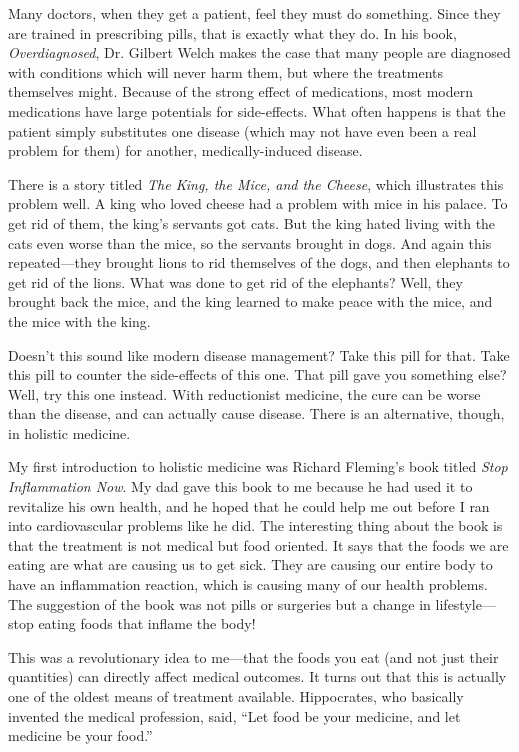 Many doctors, when they get a patient, feel they must do something.
Since they are trained in prescribing pills, that is exactly what they
do.  In his book, \textit{Overdiagnosed}, Dr. Gilbert Welch makes the
case that many people are diagnosed with conditions which will never
harm them, but where the treatments themselves might.  Because of the
strong effect of medications, most modern medications have large
potentials for side-effects. What often happens is that the patient
simply substitutes one disease (which may not have even been a real 
problem for them) for another, medically-induced disease. 

There is a story titled \textit{The King, the Mice, and the Cheese},
which illustrates this problem well. A king who loved cheese had a
problem with mice in his palace. To get rid of them, the
king's servants got cats. But the king hated living
with the cats even worse than the mice, so the servants brought in
dogs. And again this repeated---they brought lions to rid themselves of
the dogs, and then elephants to get rid of the lions. What was done to
get rid of the elephants?  Well, they brought back the mice, and the
king learned to make peace with the mice, and the mice with the king.

Doesn't this sound like modern disease management? 
Take this pill for that. Take this pill to counter the side-effects of
this one. That pill gave you something else?  Well, try this one
instead. With reductionist medicine, the cure can be worse than the
disease, and can actually cause disease.  There is an alternative, though,
in holistic medicine.

My first introduction to holistic medicine was Richard
Fleming's book titled \textit{Stop Inflammation Now}.
My dad gave this book to me because he had used it to revitalize his
own health, and he hoped that he could help me out before I ran into
cardiovascular problems like he did. The interesting thing about the
book is that the treatment is not medical but food oriented. It says
that the foods we are eating are what are causing us to get sick. They
are causing our entire body to have an inflammation reaction, which is
causing many of our health problems. The suggestion of the book was not
pills or surgeries but a change in lifestyle---stop eating foods that
inflame the body!

This was a revolutionary idea to me---that the foods you eat (and not just
their quantities) can directly affect medical outcomes. It turns out
that this is actually one of the oldest means of treatment available.
Hippocrates, who basically invented the medical profession, said,
``Let food be your medicine, and let medicine be your
food.'' 

